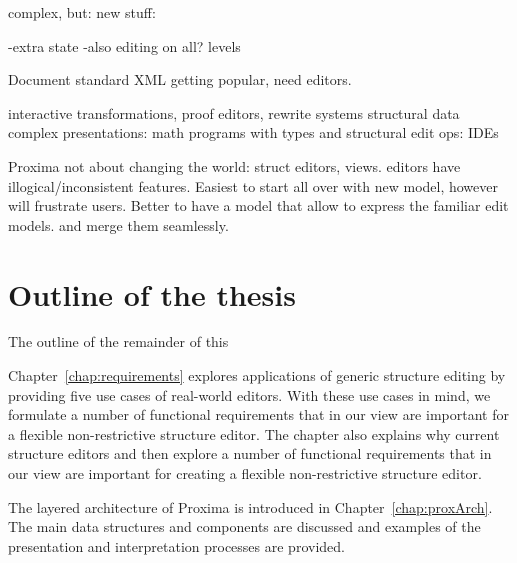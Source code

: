 


%

\bc
complex, but:
new stuff:

-extra state
-also editing on all? levels

Document standard XML getting popular, need editors.

interactive transformations, proof editors, rewrite systems
structural data complex presentations: math
programs with types and structural edit ops: IDEs

Proxima not about changing the world: struct editors, views.  editors have illogical/inconsistent features. Easiest to start all over with new model, however will frustrate users. Better to have a model that allow to express the familiar edit models. and merge them seamlessly.
\ec


\section{Outline of the thesis}


The outline of the remainder of this 

Chapter~\ref{chap:requirements} explores applications of generic structure editing by providing five use cases of real-world editors. With these use cases in mind, we formulate a number of functional requirements that in our view are important for a flexible non-restrictive structure editor. The chapter also explains why current structure editors 
\bc
 and then explore a number of functional requirements that in our view are important for creating a flexible non-restrictive structure editor.
\ec


The layered architecture of Proxima is introduced in Chapter~\ref{chap:proxArch}. The main data structures and components are discussed and examples of the presentation and interpretation processes are provided.



